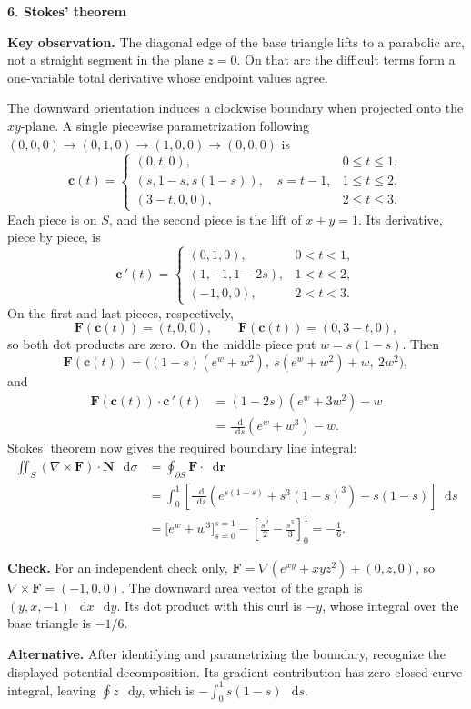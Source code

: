 \documentclass[11pt,letterpaper]{article}
\newcommand{\curl}{\nabla\times}
\renewcommand{\vec}[1]{\mathbf{#1}}
\newcommand{\dd}{\mathop{}\!\mathrm{d}}
\newcommand{\grad}{\nabla}
\newcommand{\solutionproblem}[3]{%
  \par\bigskip\Needspace{7\baselineskip}
  \noindent\textbf{#1. #2}\par\nobreak
}
\newcommand{\insight}[1]{\par\textbf{Key observation.} #1\par}
\newcommand{\verification}[1]{\par\textbf{Check.} #1\par}
\newcommand{\alternative}[1]{\par\textbf{Alternative.} #1\par}
\begin{document}
\solutionproblem{6}{Stokes' theorem}{20}
\insight{The diagonal edge of the base triangle lifts to a parabolic
arc, not a straight segment in the plane $z=0$. On that arc the difficult
terms form a one-variable total derivative whose endpoint values agree.}
The downward orientation induces a clockwise boundary when projected
onto the $xy$-plane. A single piecewise parametrization following
$(0,0,0)\to(0,1,0)\to(1,0,0)\to(0,0,0)$ is
\[
\vec c(t)=
\begin{cases}
(0,t,0),&0\leq t\leq1,\\
(s,1-s,s(1-s)),\quad s=t-1,&1\leq t\leq2,\\
(3-t,0,0),&2\leq t\leq3.
\end{cases}
\]
Each piece is on $S$, and the second piece is the lift of $x+y=1$.
Its derivative, piece by piece, is
\[
\vec c\,'(t)=
\begin{cases}
(0,1,0),&0<t<1,\\
(1,-1,1-2s),&1<t<2,\\
(-1,0,0),&2<t<3.
\end{cases}
\]
On the first and last pieces, respectively,
\[
\vec F(\vec c(t))=(t,0,0),\qquad
\vec F(\vec c(t))=(0,3-t,0),
\]
so both dot products are zero. On the middle piece put $w=s(1-s)$.
Then
\[
\vec F(\vec c(t))=
\bigl((1-s)(e^w+w^2),\ s(e^w+w^2)+w,\ 2w^2\bigr),
\]
and
\[
\begin{aligned}
\vec F(\vec c(t))\cdot\vec c\,'(t)
&=(1-2s)(e^w+3w^2)-w\\
&=\frac{\dd}{\dd s}(e^w+w^3)-w.
\end{aligned}
\]
Stokes' theorem now gives the required boundary line integral:
\[
\begin{aligned}
\iint_S(\curl\vec F)\cdot\vec N\,\dd\sigma
&=\oint_{\partial S}\vec F\cdot\dd\vec r\\
&=\int_0^1\left[\frac{\dd}{\dd s}(e^{s(1-s)}+s^3(1-s)^3)
-s(1-s)\right]\dd s\\
&=\bigl[e^w+w^3\bigr]_{s=0}^{s=1}
-\left[\frac{s^2}{2}-\frac{s^3}{3}\right]_0^1
=\boxed{-\frac16}.
\end{aligned}
\]
\verification{For an independent check only,
$\vec F=\grad(e^{xy}+xyz^2)+(0,z,0)$, so $\curl\vec F=(-1,0,0)$.
The downward area vector of the graph is $(y,x,-1)\,\dd x\,\dd y$.
Its dot product with this curl is $-y$, whose integral over the base
triangle is $-1/6$. }
\alternative{After identifying and parametrizing the boundary, recognize
the displayed potential decomposition. Its gradient contribution has
zero closed-curve integral, leaving $\oint z\,\dd y$, which is
$-\int_0^1s(1-s)\,\dd s$.}
\end{document}
